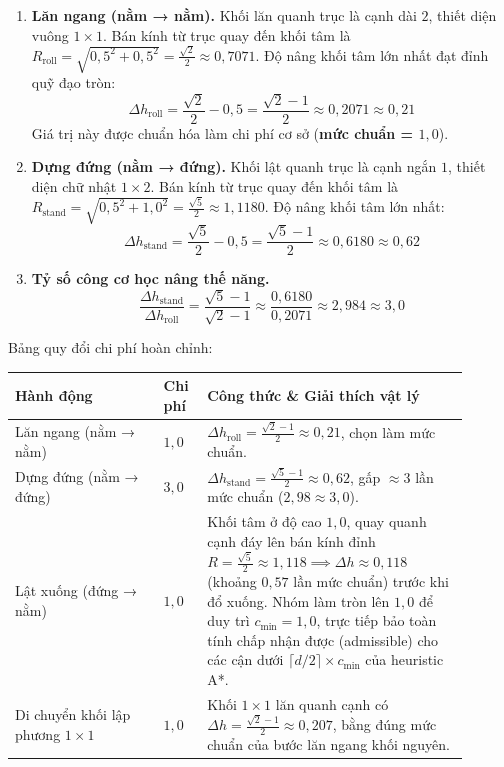 \begin{enumerate}
\item \textbf{Lăn ngang (nằm → nằm).} Khối lăn quanh trục là cạnh dài $2$, thiết diện vuông $1 \times 1$. Bán kính từ trục quay đến khối tâm là $R_{\text{roll}} = \sqrt{0{,}5^2 + 0{,}5^2} = \frac{\sqrt{2}}{2} \approx 0{,}7071$. Độ nâng khối tâm lớn nhất đạt đỉnh quỹ đạo tròn:
\[\Delta h_{\text{roll}} = \frac{\sqrt{2}}{2} - 0{,}5 = \frac{\sqrt{2} - 1}{2} \approx 0{,}2071 \approx 0{,}21\]
Giá trị này được chuẩn hóa làm chi phí cơ sở (\textbf{mức chuẩn = $1{,}0$}).
\item \textbf{Dựng đứng (nằm → đứng).} Khối lật quanh trục là cạnh ngắn $1$, thiết diện chữ nhật $1 \times 2$. Bán kính từ trục quay đến khối tâm là $R_{\text{stand}} = \sqrt{0{,}5^2 + 1{,}0^2} = \frac{\sqrt{5}}{2} \approx 1{,}1180$. Độ nâng khối tâm lớn nhất:
\[\Delta h_{\text{stand}} = \frac{\sqrt{5}}{2} - 0{,}5 = \frac{\sqrt{5} - 1}{2} \approx 0{,}6180 \approx 0{,}62\]
\item \textbf{Tỷ số công cơ học nâng thế năng.}
\[\frac{\Delta h_{\text{stand}}}{\Delta h_{\text{roll}}} = \frac{\sqrt{5} - 1}{\sqrt{2} - 1} \approx \frac{0{,}6180}{0{,}2071} \approx 2{,}984 \approx 3{,}0\]
\end{enumerate}

Bảng quy đổi chi phí hoàn chỉnh:

{\renewcommand{\arraystretch}{1.25}
\begin{longtable}{|>{\raggedright\arraybackslash}p{0.292\linewidth}|>{\raggedright\arraybackslash}p{0.085\linewidth}|>{\raggedright\arraybackslash}p{0.518\linewidth}|}
\hline
\textbf{Hành động} & \textbf{Chi phí} & \textbf{Công thức \& Giải thích vật lý} \\ \hline
\endhead
\hline
\endlastfoot
Lăn ngang (nằm → nằm) & $1{,}0$ & $\Delta h_{\text{roll}} = \frac{\sqrt{2}-1}{2} \approx 0{,}21$, chọn làm mức chuẩn. \\ \hline
Dựng đứng (nằm → đứng) & $3{,}0$ & $\Delta h_{\text{stand}} = \frac{\sqrt{5}-1}{2} \approx 0{,}62$, gấp $\approx 3$ lần mức chuẩn ($2{,}98 \approx 3{,}0$). \\ \hline
Lật xuống (đứng → nằm) & $1{,}0$ & Khối tâm ở độ cao $1{,}0$, quay quanh cạnh đáy lên bán kính đỉnh $R = \frac{\sqrt{5}}{2} \approx 1{,}118 \implies \Delta h \approx 0{,}118$ (khoảng $0{,}57$ lần mức chuẩn) trước khi đổ xuống. Nhóm làm tròn lên $1{,}0$ để duy trì $c_{\min} = 1{,}0$, trực tiếp bảo toàn tính chấp nhận được (admissible) cho các cận dưới $\lceil d/2 \rceil \times c_{\min}$ của heuristic A*. \\ \hline
Di chuyển khối lập phương $1\times 1$ & $1{,}0$ & Khối $1\times 1$ lăn quanh cạnh có $\Delta h = \frac{\sqrt{2}-1}{2} \approx 0{,}207$, bằng đúng mức chuẩn của bước lăn ngang khối nguyên. \\
\end{longtable}
}

